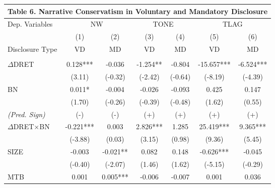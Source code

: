 \begin{table}[H] \label{T6}
  \begin{center}
  	\begin{tabular}{lcccccc}
  		\multicolumn{7}{c}{\textbf{Table 6. Narrative Conservatism in Voluntary and Mandatory Disclosure}} \\
  		\midrule
  		\midrule
  		Dep. Variables & \multicolumn{2}{c}{NW} & \multicolumn{2}{c}{TONE} & \multicolumn{2}{c}{TLAG} \\
  		\cmidrule{2-7}
  		& (1) & \multicolumn{1}{c}{(2)} & (3) & \multicolumn{1}{c}{(4)} & (5) & \multicolumn{1}{c}{(6)} \\
  		Disclosure Type & VD & MD & VD & MD & VD & MD \\
  		\midrule
  		&   & \multicolumn{1}{c}{} &   & \multicolumn{1}{c}{} &   & \multicolumn{1}{c}{} \\
  		$\Delta$DRET & 0.128*** & \multicolumn{1}{c}{-0.036} & -1.254** & \multicolumn{1}{c}{-0.804} & -15.657*** & \multicolumn{1}{c}{-6.524***} \\
  		& (3.11) & \multicolumn{1}{c}{(-0.32)} & (-2.42) & \multicolumn{1}{c}{(-0.64)} & (-8.19) & \multicolumn{1}{c}{(-4.39)} \\
  		BN & 0.011* & \multicolumn{1}{c}{-0.004} & -0.026 & \multicolumn{1}{c}{-0.093} & 0.425 & \multicolumn{1}{c}{0.147} \\
  		& (1.70) & \multicolumn{1}{c}{(-0.26)} & (-0.39) & \multicolumn{1}{c}{(-0.48)} & (1.62) & \multicolumn{1}{c}{(0.55)} \\
  		\rowcolor[rgb]{ .933,  .925,  .882} \textit{(Pred. Sign)} & (-) & (-) & (+) & (+) & (+) & (+) \\
  		\rowcolor[rgb]{ .933,  .925,  .882} $\Delta$DRET$\times$BN & -0.221*** & \multicolumn{1}{c}{0.003} & 2.826*** & \multicolumn{1}{c}{1.285} & 25.419*** & \multicolumn{1}{c}{9.365***} \\
  		\rowcolor[rgb]{ .933,  .925,  .882}   & (-3.88) & \multicolumn{1}{c}{(0.03)} & (3.15) & \multicolumn{1}{c}{(0.98)} & (9.36) & \multicolumn{1}{c}{(5.45)} \\
  		SIZE & -0.003 & \multicolumn{1}{c}{-0.021**} & 0.082 & \multicolumn{1}{c}{0.148} & -0.626*** & \multicolumn{1}{c}{-0.045} \\
  		& (-0.40) & \multicolumn{1}{c}{(-2.07)} & (1.46) & \multicolumn{1}{c}{(1.62)} & (-5.15) & \multicolumn{1}{c}{(-0.29)} \\
  		MTB & 0.001 & \multicolumn{1}{c}{0.005***} & -0.006 & \multicolumn{1}{c}{-0.007} & 0.001 & \multicolumn{1}{c}{0.036} \\

\end{tabular}
\end{center}
\end{table}
